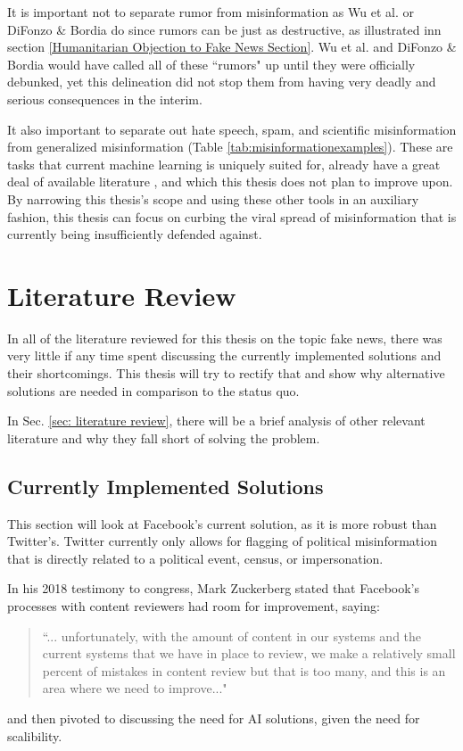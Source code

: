 \documentclass[preprint,review,12pt]{elsarticle}
\begin{document}
It is important not to separate rumor from misinformation as Wu et al. or DiFonzo \& Bordia do since rumors can be just as destructive, as illustrated inn section \ref{Humanitarian Objection to Fake News Section}. Wu et al. and DiFonzo \& Bordia would have called all of these ``rumors" up until they were officially debunked, yet this delineation did not stop them from having very deadly and serious consequences in the interim.

It also important to separate out hate speech, spam, and scientific misinformation from generalized misinformation (Table \ref{tab:misinformationexamples}). These are tasks that current machine learning is uniquely suited for, already have a great deal of available literature \cite{xu2019exploiting,wang2010detecting,ahmed2018detecting,al2019spam,oriola2020evaluating,gaydhani2018detecting,al2020lies,farrell2019evidence}, and which this thesis does not plan to improve upon. By narrowing this thesis's scope and using these other tools in an auxiliary fashion, this thesis can focus on curbing the viral spread of misinformation that is currently being insufficiently defended against. 

\section{Literature Review}
In all of the literature reviewed for this thesis on the topic fake news, there was very little if any time spent discussing the currently implemented solutions and their shortcomings. This thesis will try to rectify that and show why alternative solutions are needed in comparison to the status quo.

In Sec. \ref{sec: literature review}, there will be a brief analysis of other relevant literature and why they fall short of solving the problem.

\subsection{Currently Implemented Solutions}
\label{sec: currently implemented solutions}
This section will look at Facebook's current solution, as it is more robust than Twitter's. Twitter currently only allows for flagging of political misinformation that is directly related to a political event, census, or impersonation.

In his 2018 testimony to congress, Mark Zuckerberg stated that Facebook's processes with content reviewers had room for improvement, saying: \begin{quote}``... unfortunately, with the amount of content in our systems and the current systems that we have in place to review, we make a relatively small percent of mistakes in content review but that is too many, and this is an area where we need to improve..." \cite{energy2018facebook}\end{quote} and then pivoted to discussing the need for AI solutions, given the need for scalibility.
\end{document}

